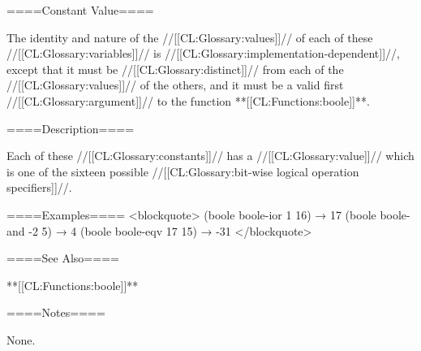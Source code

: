 
====Constant Value====

The identity and nature of the //[[CL:Glossary:values]]// of each of these //[[CL:Glossary:variables]]// is //[[CL:Glossary:implementation-dependent]]//, except that it must be //[[CL:Glossary:distinct]]// from each of the //[[CL:Glossary:values]]// of the others, and it must be a valid first //[[CL:Glossary:argument]]// to the function **[[CL:Functions:boole]]**.

====Description====

Each of these //[[CL:Glossary:constants]]// has a //[[CL:Glossary:value]]// which is one of the sixteen possible //[[CL:Glossary:bit-wise logical operation specifiers]]//.

====Examples==== <blockquote> (boole boole-ior 1 16) → 17 (boole boole-and -2 5) → 4 (boole boole-eqv 17 15) → -31 </blockquote>

====See Also====

**[[CL:Functions:boole]]**

====Notes====

None.

